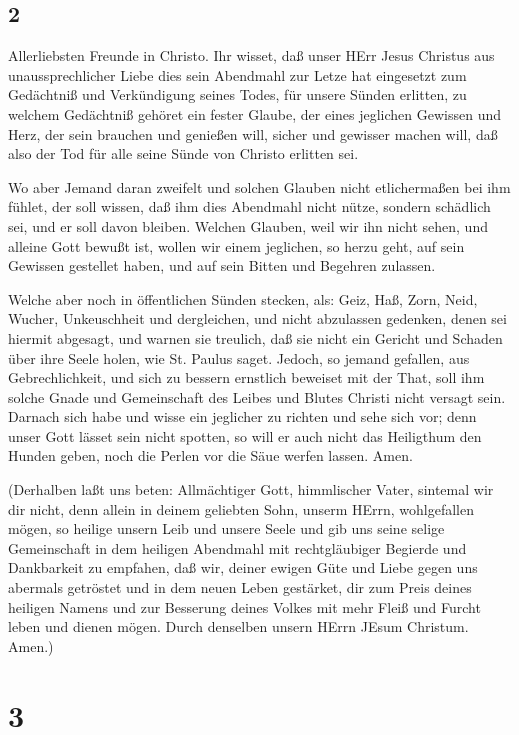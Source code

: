 \subsection{2}
Allerliebsten Freunde in Christo. Ihr wisset, daß unser HErr Jesus Christus aus unaussprechlicher Liebe dies sein Abendmahl zur Letze hat eingesetzt zum Gedächtniß und Verkündigung seines Todes, für unsere Sünden erlitten, zu welchem Gedächtniß gehöret ein fester Glaube, der eines jeglichen Gewissen und Herz, der sein brauchen und genießen will, sicher und gewisser machen will, daß also der Tod für alle seine Sünde von Christo erlitten sei.

Wo aber Jemand daran zweifelt und solchen Glauben nicht etlichermaßen bei ihm fühlet, der soll wissen, daß ihm dies Abendmahl nicht nütze, sondern schädlich sei, und er soll davon bleiben. Welchen Glauben, weil wir ihn nicht sehen, und alleine Gott bewußt ist, wollen wir einem jeglichen, so herzu geht, auf sein Gewissen gestellet haben, und auf sein Bitten und Begehren zulassen.

Welche aber noch in öffentlichen Sünden stecken, als: Geiz, Haß, Zorn, Neid, Wucher, Unkeuschheit und dergleichen, und nicht abzulassen gedenken, denen sei hiermit abgesagt, und warnen sie treulich, daß sie nicht ein Gericht und Schaden über ihre Seele holen, wie St. Paulus saget. Jedoch, so jemand gefallen, aus Gebrechlichkeit, und sich zu bessern ernstlich beweiset mit der That, soll ihm solche Gnade und Gemeinschaft des Leibes und Blutes Christi nicht versagt sein. Darnach sich habe und wisse ein jeglicher zu richten und sehe sich vor; denn unser Gott lässet sein nicht spotten, so will er auch nicht das Heiligthum den Hunden geben, noch die Perlen vor die Säue werfen lassen. Amen.

(Derhalben laßt uns beten: Allmächtiger Gott, himmlischer Vater, sintemal wir dir nicht, denn allein in deinem geliebten Sohn, unserm HErrn, wohlgefallen
mögen, so heilige unsern Leib und unsere Seele und gib uns seine selige Gemeinschaft in dem heiligen Abendmahl mit rechtgläubiger Begierde und Dankbarkeit zu empfahen, daß wir, deiner ewigen Güte und Liebe gegen uns abermals getröstet und in dem neuen Leben gestärket, dir zum Preis deines heiligen Namens und zur Besserung deines Volkes mit mehr Fleiß und Furcht leben und dienen mögen. Durch denselben unsern HErrn JEsum Christum. Amen.)


\section{3}

